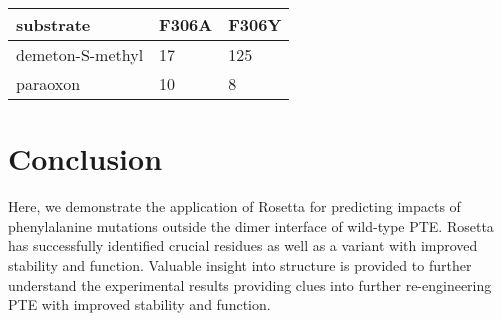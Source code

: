 \begin{refsection}
\begin{table}[htbp]
    \begin{tabular}{lll}
    \hline

    substrate & F306A & F306Y \\
    \hline

    demeton-S-methyl & 17 & 125 \\
    paraoxon & 10 & 8 \\

    \hline  
    \end{tabular}
    \label{tab:gopal}
\end{table}

\section{Conclusion}

Here, we demonstrate the application of Rosetta for predicting impacts of
phenylalanine mutations outside the dimer interface of wild-type PTE. Rosetta
has successfully identified crucial residues as well as a variant with improved
stability and function. Valuable insight into structure is provided to further
understand the experimental results providing clues into further re-engineering
PTE with improved stability and function. 


\end{refsection}
